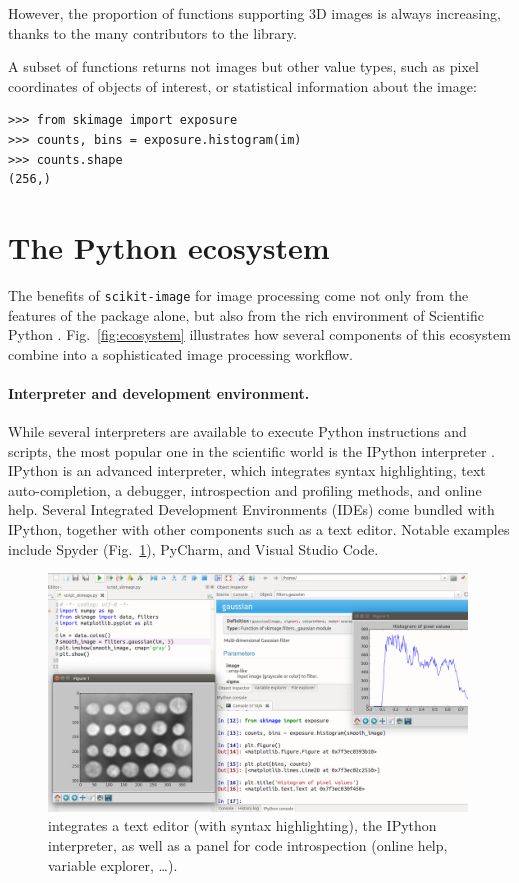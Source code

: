 \documentclass[twocolumn]{bmcart}%
\begin{document}
However, the proportion of functions supporting 3D images is always increasing,
thanks to the many contributors to the library.

A subset of functions returns not images but other value types,
such as pixel coordinates of objects of interest, or statistical
information about the image:
\begin{lstlisting}
>>> from skimage import exposure
>>> counts, bins = exposure.histogram(im)
>>> counts.shape
(256,)
\end{lstlisting}

\section*{The Python ecosystem}

The benefits of \texttt{scikit-image} for image processing come not only
from the features of the package alone, but also from the rich
environment of Scientific Python \citep{Oliphant2007, Perez2011}.
Fig.~\ref{fig:ecosystem} illustrates how several components of this
ecosystem combine into a sophisticated image processing workflow.

\paragraph{Interpreter and development environment.}

While several interpreters are available to execute Python
instructions and scripts, the most popular one in the scientific world is
the IPython interpreter \citep{Perez2007, Rossant2015}. IPython is an
advanced interpreter, which integrates syntax highlighting, text auto-completion,
a debugger,
introspection and profiling methods, and online help. Several
Integrated Development Environments (IDEs) come bundled with IPython,
together with other components such as a text editor. Notable examples
include Spyder (Fig.~\ref{fig:spyder}), PyCharm, and Visual Studio Code.

\begin{figure}
    \centerline{\includegraphics[width=0.99\textwidth]{spyder_process}}
    \caption{ integrates a text editor (with
	syntax highlighting), the IPython interpreter, as well as a panel
	for code introspection (online help, variable explorer, \dots).
 \label{fig:spyder}}
\end{figure}
\end{document}
